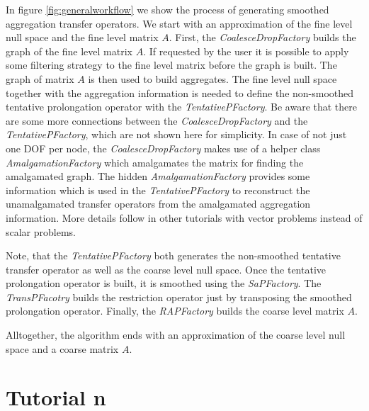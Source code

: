 In figure \ref{fig:generalworkflow} we show the process of generating smoothed aggregation transfer operators. We start with an approximation of the fine level null space and the fine level matrix $A$. 
First, the \textit{CoalesceDropFactory} builds the graph of the fine level matrix $A$. If requested by the user it is possible to apply some filtering strategy to the fine level matrix before the graph is built. The graph of matrix $A$ is then used to build aggregates. The fine level null space together with the aggregation information is needed to define the non-smoothed tentative prolongation operator with the \textit{TentativePFactory}. Be aware that there are some more connections between the \textit{CoalesceDropFactory} and the \textit{TentativePFactory}, which are not shown here for simplicity. In case of not just one DOF per node, the \textit{CoalesceDropFactory} makes use of a helper class \textit{AmalgamationFactory} which amalgamates the matrix for finding the amalgamated graph. The hidden \textit{AmalgamationFactory} provides some information which is used in the \textit{TentativePFactory} to reconstruct the unamalgamated transfer operators from the amalgamated aggregation information. More details follow in other tutorials with vector problems instead of scalar problems.

Note, that the \textit{TentativePFactory} both generates the non-smoothed tentative transfer operator as well as the coarse level null space. Once the tentative prolongation operator is built, it is smoothed using the \textit{SaPFactory}. The \textit{TransPFacotry} builds the restriction operator just by transposing the smoothed prolongation operator. Finally, the \textit{RAPFactory} builds the coarse level matrix $A$.

Alltogether, the algorithm ends with an approximation of the coarse level null space and a coarse matrix $A$.


\section{Tutorial n}


